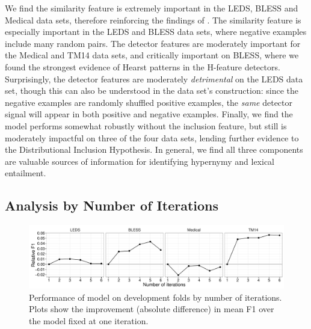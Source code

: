 We find the similarity feature is extremely important in the LEDS, BLESS and
Medical data sets, therefore reinforcing the findings of
. The similarity feature is especially important in
the LEDS and BLESS data sets, where negative examples include many random
pairs. The detector features are moderately important for the Medical and TM14 data sets,
and critically important on BLESS, where we found the strongest evidence
of Hearst patterns in the H-feature detectors.
Surprisingly, the detector features are moderately {\em detrimental} on the
LEDS data set, though this can also be understood in the data set's construction:
since the negative examples are randomly shuffled positive examples, the
{\em same} detector signal will appear in both positive and negative examples.
Finally, we find the model performs somewhat robustly without the inclusion
feature, but still is moderately impactful on three of the four data sets,
lending further evidence to the Distributional Inclusion Hypothesis.
In general, we find all three components are valuable sources of information
for identifying hypernymy and lexical entailment.

\subsection{Analysis by Number of Iterations}

\begin{figure}
  \begin{center}
  \includegraphics[width=1.00\textwidth]{plots/hpmbyiter}
\end{center}
\caption{Performance of model on development folds by number of iterations. Plots
show the improvement (absolute difference) in mean F1 over the model fixed at one
iteration.}
\label{fig:byiteration}
\end{figure}

